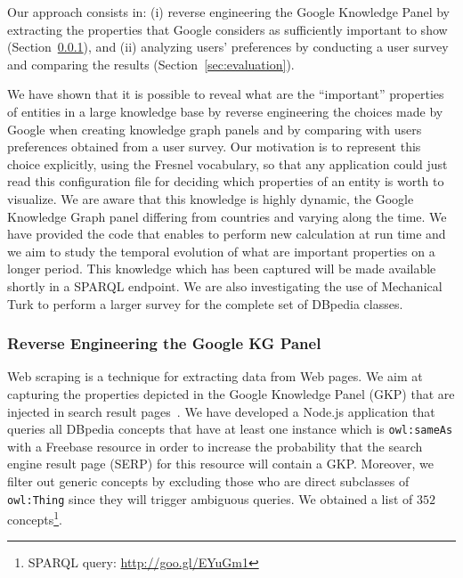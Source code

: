 \documentclass[onecolumn, crcready]{iosart2c}
\begin{document}
Our approach consists in: (i) reverse engineering the Google Knowledge Panel by extracting the properties that Google considers as sufficiently important to show (Section~\ref{sec:knowledge-graph}), and (ii) analyzing users' preferences by conducting a user survey and comparing the results (Section~\ref{sec:evaluation}).

We have shown that it is possible to reveal what are the ``important'' properties of entities in a large knowledge base by reverse engineering the choices made by Google when creating knowledge graph panels and by comparing with users preferences obtained from a user survey. Our motivation is to represent this choice explicitly, using the Fresnel vocabulary, so that any application could just read this configuration file for deciding which properties of an entity is worth to visualize. We are aware that this knowledge is highly dynamic, the Google Knowledge Graph panel differing from countries and varying along the time. We have provided the code that enables to perform new calculation at run time and we aim to study the temporal evolution of what are important properties on a longer period. This knowledge which has been captured will be made available shortly in a SPARQL endpoint. We are also investigating the use of Mechanical Turk to perform a larger survey for the complete set of DBpedia classes.

\subsubsection{Reverse Engineering the Google KG Panel}
\label{sec:knowledge-graph}
Web scraping is a technique for extracting data from Web pages. We aim at capturing the properties depicted in the Google Knowledge Panel (GKP) that are injected in search result pages~\cite{Bergman2012}. We have developed a Node.js application that queries all DBpedia concepts that have at least one instance which is \texttt{owl:sameAs} with a Freebase resource in order to increase the probability that the search engine result page (SERP) for this resource will contain a GKP. Moreover, we filter out generic concepts by excluding those who are direct subclasses of \texttt{owl:Thing} since they will trigger ambiguous queries. We obtained a list of $352$ concepts\footnote{SPARQL query: \url{http://goo.gl/EYuGm1}}.
\end{document}
